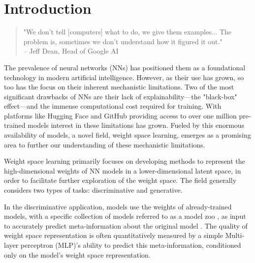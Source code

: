 \graphicspath{{introduction/fig/}}

\chapter{Introduction}
\label{chap:introduction}

\begin{quote}
    "We don't tell [computers] what to do, we give them examples... The problem is, sometimes we don't understand how it figured it out."\\ %
    \vspace{0.5em} %
    \hfill -- Jeff Dean, Head of Google AI \cite{Dean2017BlackBox}
\end{quote}


The prevalence of neural networks (NNs) has positioned them as a foundational technology in modern artificial intelligence. However, as their use has grown, so too has the focus on their inherent mechanistic limitations. Two of the most significant drawbacks of NNs are their lack of explainability---the "black-box" effect---and the immense computational cost required for training. With platforms like Hugging Face and GitHub providing access to over one million pre-trained models \cite{huggingface2024review} interest in these limitations has grown. Fueled by this enormous availability of models, a novel field, weight space learning, emerges as a promising area to further our understanding of these mechanistic limitations.



Weight space learning primarily focuses on developing methods to represent the high-dimensional weights of NN models in a lower-dimensional latent space, in order to facilitate further exploration of the weight space. The field generally considers two types of tasks: discriminative and generative.

In the discriminative application, models use the weights of already-trained models, with a specific collection of models referred to as a model zoo \cite{schurholt2022modelzoosdatasetdiverse}, as input to accurately predict meta-information about the original model \cite{unterthiner2021predictingneuralnetworkaccuracy}. The quality of weight space representation is often quantitatively measured by a simple Multi-layer perceptron (MLP)'s ability to predict this meta-information, conditioned only on the model's weight space representation. 

